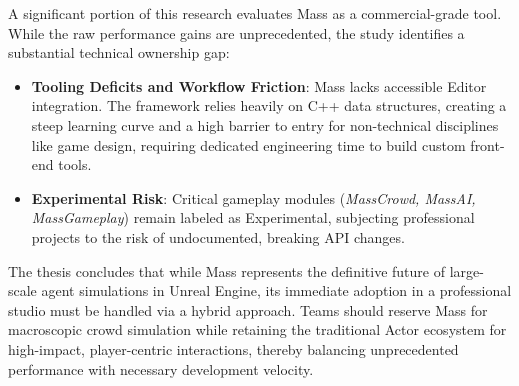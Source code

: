 \documentclass[%
    a4paper, %
    corpo=12pt, %
    oneside, %
    stile=standard,
    tipotesi=magistrale,
    numerazioneromana, %
    openright, %
    cucitura=7mm, %
]{toptesi}
\begin{document}
A significant portion of this research evaluates Mass as a commercial-grade tool. While the raw performance gains are unprecedented, the study identifies a substantial technical ownership gap:

\begin{itemize}
    \item \textbf{Tooling Deficits and Workflow Friction}: Mass lacks accessible Editor integration. The framework relies heavily on C++ data structures, creating a steep learning curve and a high barrier to entry for non-technical disciplines like game design, requiring dedicated engineering time to build custom front-end tools.
    \item \textbf{Experimental Risk}: Critical gameplay modules (\textit{MassCrowd, MassAI, MassGameplay}) remain labeled as Experimental, subjecting professional projects to the risk of undocumented, breaking API changes.
\end{itemize}

The thesis concludes that while Mass represents the definitive future of large-scale agent simulations in Unreal Engine, its immediate adoption in a professional studio must be handled via a hybrid approach. Teams should reserve Mass for macroscopic crowd simulation while retaining the traditional Actor ecosystem for high-impact, player-centric interactions, thereby balancing unprecedented performance with necessary development velocity.
\end{document}
